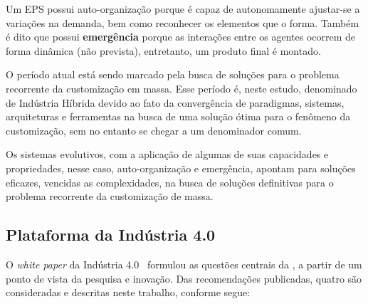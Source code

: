 Um EPS possui auto-organização porque é capaz de autonomamente ajustar-se a variações na demanda, bem como reconhecer os elementos que o forma. Também é dito que possui \textbf{emergência} porque as interações entre os agentes ocorrem de forma dinâmica (não prevista), entretanto, um produto final é montado.

O período atual está sendo marcado pela busca de soluções para o problema recorrente da customização em massa. Esse período é, neste estudo, denominado de Indústria Híbrida devido ao fato da convergência de paradigmas, sistemas, arquiteturas e ferramentas na busca de uma solução ótima para o fenômeno da customização, sem no entanto se chegar a um denominador comum. 

Os sistemas evolutivos, com a aplicação de algumas de suas capacidades e propriedades, nesse caso, auto-organização e emergência, apontam para soluções eficazes, vencidas as complexidades, na busca de soluções definitivas para o problema recorrente da customização de massa.



\subsection{Plataforma da Indústria 4.0}	

O \textit{white paper} da Indústria 4.0~\cite{BITKOM2015} formulou as questões centrais da \iQuatroZero, a partir de um ponto de vista da pesquisa e inovação. Das recomendações publicadas, quatro são consideradas e descritas neste trabalho, conforme segue:

